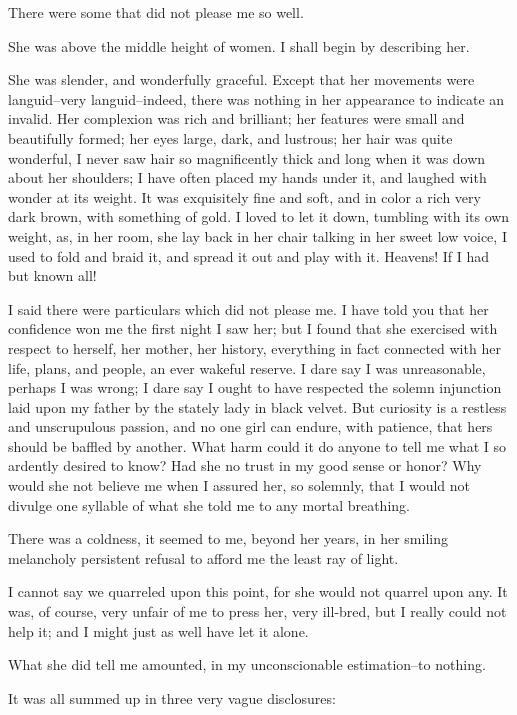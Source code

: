 \documentclass[11pt,twoside,makeidx,hidelinks,]{memoir}
\begin{document}
There were some that did not please me so well.

She was above the middle height of women. I shall begin by describing
her.

She was slender, and wonderfully graceful. Except that her movements
were languid--very languid--indeed, there was nothing in her appearance
to indicate an invalid. Her complexion was rich and brilliant; her
features were small and beautifully formed; her eyes large, dark, and
lustrous; her hair was quite wonderful, I never saw hair so
magnificently thick and long when it was down about her shoulders; I
have often placed my hands under it, and laughed with wonder at its
weight. It was exquisitely fine and soft, and in color a rich very dark
brown, with something of gold. I loved to let it down, tumbling with its
own weight, as, in her room, she lay back in her chair talking in her
sweet low voice, I used to fold and braid it, and spread it out and
play with it. Heavens! If I had but known all!

I said there were particulars which did not please me. I have told you
that her confidence won me the first night I saw her; but I found that
she exercised with respect to herself, her mother, her history,
everything in fact connected with her life, plans, and people, an ever
wakeful reserve. I dare say I was unreasonable, perhaps I was wrong; I
dare say I ought to have respected the solemn injunction laid upon my
father by the stately lady in black velvet. But curiosity is a restless
and unscrupulous passion, and no one girl can endure, with patience,
that hers should be baffled by another. What harm could it do anyone to
tell me what I so ardently desired to know? Had she no trust in my good
sense or honor? Why would she not believe me when I assured her, so
solemnly, that I would not divulge one syllable of what she told me to
any mortal breathing.

There was a coldness, it seemed to me, beyond her years, in her smiling
melancholy persistent refusal to afford me the least ray of light.

I cannot say we quarreled upon this point, for she would not quarrel
upon any. It was, of course, very unfair of me to press her, very
ill-bred, but I really could not help it; and I might just as well have
let it alone.

What she did tell me amounted, in my unconscionable estimation--to
nothing.

It was all summed up in three very vague disclosures:
\end{document}

